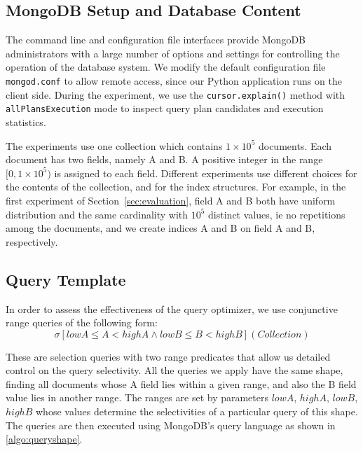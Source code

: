\subsection{MongoDB Setup and Database Content}
The command line and configuration file interfaces provide 
MongoDB administrators with a large number of options and 
settings for controlling the operation of the database 
system.  We modify the default configuration  file
\verb|mongod.conf| to  allow  remote  access,  since  
our  Python  application  runs  on  the client side. 
During the experiment, we use the \verb|cursor.explain()| 
method with \verb|allPlansExecution| mode to inspect query
plan candidates and execution statistics. 

The experiments use one collection which contains $1 
\times 10^5$ documents. Each document has two fields, 
namely A and B. A positive integer in the range $[0, 1\times 10^5)$ 
is assigned to each field. 
Different experiments use different choices for the contents of the collection, and for the index structures. For example, in the first experiment of Section~\ref{sec:evaluation},
field A and B both have uniform distribution and the 
same cardinality with $10^5$ distinct values, ie no repetitions among the documents, and we create indices A 
and B on field A and B, respectively.

\subsection{Query Template}
In order to assess the effectiveness of the query optimizer, we use conjunctive range queries of the following form:
$$ \sigma [ \mathit{lowA} \le A < \mathit{highA} \wedge \mathit{lowB} \le B < \mathit{highB} ] ( \mathit{Collection} ) $$

These are selection queries with two range predicates that allow us detailed control on the query selectivity.
All the queries we apply have the same shape, finding all documents whose A field lies within a given range, and also the B field value lies in another range. The ranges are set by parameters $\mathit{lowA}$, $\mathit{highA}$, $\mathit{lowB}$, $\mathit{highB}$ whose values determine the selectivities of a particular query of this shape.
The queries are then executed using MongoDB's query language as shown in \autoref{algo:queryshape}.

